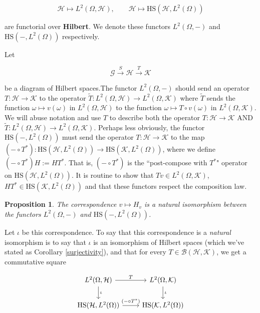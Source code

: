 \documentclass{article}
\numberwithin{theorem}{section}
\numberwithin{lemma}{section}
\numberwithin{definition}{section}
\numberwithin{assumption}{section}
\newtheorem{proposition}{Proposition}
\numberwithin{proposition}{section}
\numberwithin{remark}{section}
\numberwithin{corollary}{section}
\numberwithin{conjecture}{section}
\numberwithin{example}{section}
\begin{document}
\begin{multicols*}{2}
$$
    \mathcal H \mapsto L^2(\Omega, \mathcal H), \qquad
    \mathcal H \mapsto \text{HS}(\mathcal H, L^2(\Omega))
$$

are functorial over \textbf{Hilbert}. We denote these functors $L^2(\Omega, -)$ and $\text{HS}(-, L^2(\Omega))$ respectively. 

Let

$$\mathcal G \xrightarrow{S} \mathcal H \xrightarrow{T} \mathcal K$$

be a diagram of Hilbert spaces.The functor $L^2(\Omega, -)$ should send an operator $T: \mathcal H \to \mathcal K$ to the operator $\tilde T: L^2(\Omega, \mathcal H) \to L^2(\Omega, \mathcal K)$ where $\tilde T$ sends the function $\omega \mapsto v(\omega)$ in $L^2(\Omega, \mathcal H)$ to the function $\omega \mapsto T \circ v(\omega)$ in $L^2(\Omega, \mathcal K)$. We will abuse notation and use $T$ to describe both the operator $T: \mathcal H \to \mathcal K$ AND $\tilde T: L^2(\Omega, \mathcal H) \to L^2(\Omega, \mathcal K)$. Perhaps less obviously, the functor $\text{HS}(-,L^2(\Omega))$ must send the operator $T: \mathcal H \to \mathcal K$ to the map 
$ (- \circ T^*): \text{HS}(\mathcal H, L^2(\Omega)) \to \text{HS}(\mathcal K, L^2(\Omega))$, where we define $(- \circ T^*)H := HT^*$. That is, $(- \circ T^*)$ is the ``post-compose with $T^*$" operator on $\text{HS}(\mathcal H, L^2(\Omega))$. It is routine to show that $Tv \in L^2(\Omega, \mathcal K)$, $HT^* \in \text{HS}(\mathcal K, L^2(\Omega))$ and that these functors respect the composition law. 


\begin{proposition}
    The correspondence $v \mapsto H_v$ is a \textit{natural} isomorphism between the functors $L^2(\Omega, -)$ and $\mathrm{HS}(-,L^2(\Omega))$. 
\end{proposition}

Let $\iota$ be this correspondence. To say that this correspondence is a \textit{natural} isomorphism is to say that $\iota$ is an isomorphism of Hilbert spaces (which we've stated as Corollary \ref{surjectivity}), and that for every  $T \in \mathcal B(\mathcal H, \mathcal K)$, we get a commutative square 

\[
\begin{tikzcd}
L^2(\Omega, \mathcal H) 
\arrow[r, "T"] \arrow[d, "\mathbf \iota"] & 
L^2(\Omega, \mathcal K) \arrow[d, "\iota"] \\
\text{HS}(\mathcal H, L^2(\Omega) ) \arrow[r, "(-\circ T^*)"] & 
\text{HS}(\mathcal K, L^2(\Omega) )
\end{tikzcd}
\]


\end{multicols*}
\end{document}
